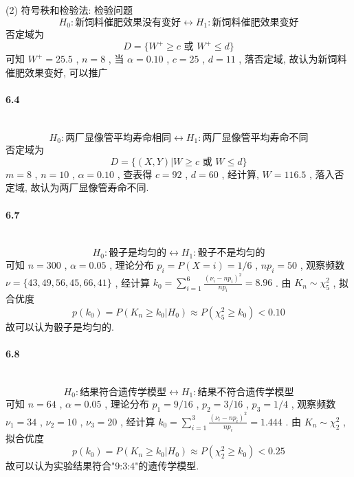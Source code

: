 \documentclass[a4paper, UTF8]{ctexart}
\begin{document}
        \noindent(2) 符号秩和检验法: 检验问题
        \[H_0 : \text{新饲料催肥效果没有变好} \leftrightarrow H_1 : \text{新饲料催肥效果变好}\]
        否定域为
        \[D=\{W^+ \ge c \text{ 或 } W^+ \le d\}\]
        可知 $W^+ = 25.5$ , $n = 8$ , 当 $\alpha = 0.10$ , $c = 25$ , $d = 11$ ,
        落否定域, 故认为新饲料催肥效果变好, 可以推广\\
    
    \paragraph{6.4}\quad\\
        \[H_0 : \text{两厂显像管平均寿命相同} \leftrightarrow H_1 : \text{两厂显像管平均寿命不同}\]
        否定域为
        \[D=\{(X,Y)|W \ge c \text{ 或 } W \le d\}\]
        $m = 8$ , $n = 10$ , $\alpha = 0.10$ , 查表得 $c = 92$ , $d = 60$ , 经计算, $W = 116.5$ , 落入否定域, 故认为两厂显像管寿命不同.\\
    
    \paragraph{6.7}\quad\\
        \[H_0 : \text{骰子是均匀的} \leftrightarrow H_1 : \text{骰子不是均匀的}\]
        可知 $n = 300$ , $\alpha = 0.05$ , 理论分布 $p_i = P(X = i) = 1/6$ , $n p_i = 50$ , 观察频数 $\nu = \{43, 49, 56, 45, 66, 41\}$ , 经计算 $k_0 = \sum^{6}_{i = 1}\frac{(\nu_i - n p_i)^2}{n p_i} = 8.96$ .
        由 $K_n \sim \chi^2_5$ , 拟合优度 
        \[p(k_0) = P(K_n \ge k_0 | H_0) \approx P(\chi^2_5 \ge k_0) < 0.10 \]
        故可以认为骰子是均匀的.\\
    
    \paragraph{6.8}\quad\\
        \[H_0 : \text{结果符合遗传学模型} \leftrightarrow H_1 : \text{结果不符合遗传学模型}\]
        可知 $n = 64$ , $\alpha = 0.05$ , 理论分布 $p_1 = 9/16$ , $p_2 = 3/16$ , $p_3 = 1/4$ , 观察频数 $\nu_1 = 34$ , $\nu_2 = 10$ , $\nu_3 = 20$ , 经计算 $k_0 = \sum^{3}_{i = 1}\frac{(\nu_i - n p_i)^2}{n p_i} = 1.444$ .
        由 $K_n \sim \chi^2_2$ , 拟合优度 
        \[p(k_0) = P(K_n \ge k_0 | H_0) \approx P(\chi^2_2 \ge k_0) < 0.25 \]
        故可以认为实验结果符合"9:3:4"的遗传学模型.\\

    
\end{document}
